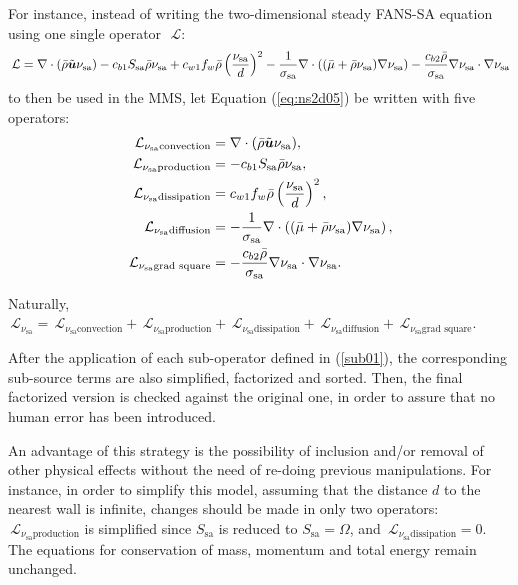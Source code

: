 \documentclass[10pt]{article}
\newcommand{\bv}[1]{\ensuremath{\mbox{\boldmath$ #1 $}}}
\newcommand{\Lo}{\,\mathcal{L}}
\newcommand{\sa}{\nu_{\mathrm{sa}}}
\newcommand{\tsa}{\mathrm{sa}}
\newcommand{\brho}{\bar{\rho}}
\newcommand{\bmu}{\bar{\mu}}
\begin{document}
For instance, instead of writing the two-dimensional steady FANS-SA equation using one single operator~$\Lo$:
 \begin{equation} \label{eq:ns2d05}
\Lo=\nabla \cdot (\bar{\rho} \tilde{\bv{u}} \sa) - c_{b1} S_\tsa \bar{\rho} \sa +c_{w1} f_w \brho \left(\dfrac{\sa}{d}\right)^2 - \dfrac{1}{\sigma_{\tsa}}\nabla \cdot \left( (\bmu+\bar{\rho}  \sa) \nabla \sa\right) -\dfrac{c_{b2} \bar{\rho} }{\sigma_{\tsa}} \nabla \sa \cdot \nabla \sa
\end{equation}
to then be used in the MMS, let Equation (\ref{eq:ns2d05}) be written with five operators:
\begin{equation}
 \begin{split}\label{sub01}
  \Lo_{\sa \text{convection}} &=\nabla \cdot (\bar{\rho} \tilde{\bv{u}} \sa) ,\\
  \Lo_{\sa \text{production}} &=- c_{b1} S_\tsa \bar{\rho} \sa ,\\
  \Lo_{\sa \text{dissipation}}&=c_{w1} f_w \brho \left(\dfrac{\sa}{d}\right)^2 ,\\
  \Lo_{\sa \text{diffusion}}  &=- \dfrac{1}{\sigma_{\tsa}}\nabla \cdot \left( (\bmu+\bar{\rho}  \sa) \nabla \sa\right), \\
  \Lo_{\sa \text{grad square}} &= -\dfrac{c_{b2} \bar{\rho} }{\sigma_{\tsa}} \nabla \sa \cdot \nabla \sa.
 \end{split}
\end{equation}

Naturally, $\Lo_{\sa }=\Lo_{\sa \text{convection}} +  \Lo_{\sa \text{production}} +  \Lo_{\sa \text{dissipation}}+  \Lo_{\sa \text{diffusion}}  +  \Lo_{\sa \text{grad square}}$.


 After the application of each sub-operator defined in (\ref{sub01}), the corresponding sub-source terms are also simplified, factorized and sorted. Then, the final factorized version is checked against the original one, in order to assure that no human error has been introduced.

An advantage of this strategy is the possibility of inclusion and/or removal of other physical effects without the need of re-doing previous manipulations. For instance, in order to simplify this model, assuming that the distance $d$ to the nearest wall is infinite, changes should be made in only two operators:  $\Lo_{\sa \text{production}}$ is simplified since $S_\tsa$ is reduced to $S_\tsa=\Omega$, and $ \Lo_{\sa \text{dissipation}}=0$. The equations for conservation  of mass, momentum and total energy remain unchanged.
\end{document}
